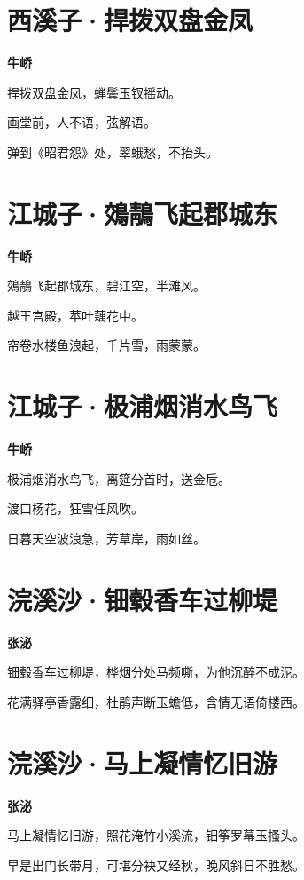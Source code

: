 \documentclass[12pt,a4paper]{ctexbook}
\begin{document}
\section{西溪子·捍拨双盘金凤}
\textbf{牛峤}\par\vspace{0.5em}
捍拨双盘金凤，蝉鬓玉钗摇动。\par
画堂前，人不语，弦解语。\par
弹到《昭君怨》处，翠蛾愁，不抬头。\par

\section{江城子·鵁鶄飞起郡城东}
\textbf{牛峤}\par\vspace{0.5em}
鵁鶄飞起郡城东，碧江空，半滩风。\par
越王宫殿，苹叶藕花中。\par
帘卷水楼鱼浪起，千片雪，雨蒙蒙。\par

\section{江城子·极浦烟消水鸟飞}
\textbf{牛峤}\par\vspace{0.5em}
极浦烟消水鸟飞，离筵分首时，送金卮。\par
渡口杨花，狂雪任风吹。\par
日暮天空波浪急，芳草岸，雨如丝。\par

\section{浣溪沙·钿毂香车过柳堤}
\textbf{张泌}\par\vspace{0.5em}
钿毂香车过柳堤，桦烟分处马频嘶，为他沉醉不成泥。\par
花满驿亭香露细，杜鹃声断玉蟾低，含情无语倚楼西。\par

\section{浣溪沙·马上凝情忆旧游}
\textbf{张泌}\par\vspace{0.5em}
马上凝情忆旧游，照花淹竹小溪流，钿筝罗幕玉搔头。\par
早是出门长带月，可堪分袂又经秋，晚风斜日不胜愁。\par
\end{document}
